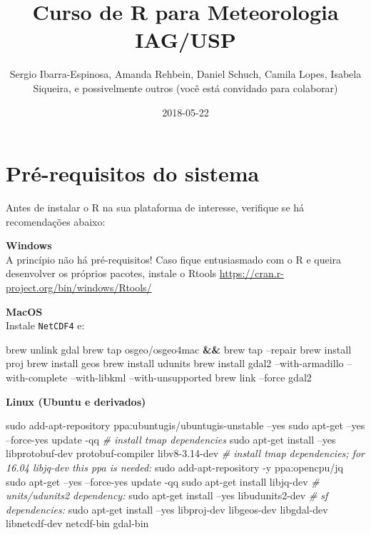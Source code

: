 \documentclass[]{book}
\title{Curso de R para Meteorologia IAG/USP}
\author{Sergio Ibarra-Espinosa, Amanda Rehbein, Daniel Schuch, Camila Lopes,
Isabela Siqueira, e possivelmente outros (você está convidado para
colaborar)}
\date{2018-05-22}
\newenvironment{Shaded}{\begin{snugshade}}{\end{snugshade}}
\newcommand{\KeywordTok}[1]{\textcolor[rgb]{0.13,0.29,0.53}{\textbf{#1}}}
\newcommand{\CommentTok}[1]{\textcolor[rgb]{0.56,0.35,0.01}{\textit{#1}}}
\newcommand{\FunctionTok}[1]{\textcolor[rgb]{0.00,0.00,0.00}{#1}}
\newcommand{\ExtensionTok}[1]{#1}
\newcommand{\NormalTok}[1]{#1}
\begin{document}
\maketitle

{
\setcounter{tocdepth}{1}
\tableofcontents
}
\chapter{Pré-requisitos do sistema}\label{primero}

Antes de instalar o R na sua plataforma de interesse, verifique se há
recomendações abaixo:

\textbf{Windows}\\
A princípio não há pré-requisitos! Caso fique entusiasmado com o R e
queira desenvolver os próprios pacotes, instale o Rtools
\url{https://cran.r-project.org/bin/windows/Rtools/}

\textbf{MacOS}\\
Instale \texttt{NetCDF4} e:

\begin{Shaded}
\begin{Highlighting}[]
\ExtensionTok{brew}\NormalTok{ unlink gdal}
\ExtensionTok{brew}\NormalTok{ tap osgeo/osgeo4mac }\KeywordTok{&&} \ExtensionTok{brew}\NormalTok{ tap --repair}
\ExtensionTok{brew}\NormalTok{ install proj}
\ExtensionTok{brew}\NormalTok{ install geos}
\ExtensionTok{brew}\NormalTok{ install udunits}
\ExtensionTok{brew}\NormalTok{ install gdal2 --with-armadillo --with-complete --with-libkml --with-unsupported}
\ExtensionTok{brew}\NormalTok{ link --force gdal2}
\end{Highlighting}
\end{Shaded}

\textbf{Linux (Ubuntu e derivados)}

\begin{Shaded}
\begin{Highlighting}[]
\FunctionTok{sudo}\NormalTok{ add-apt-repository ppa:ubuntugis/ubuntugis-unstable --yes}
\FunctionTok{sudo}\NormalTok{ apt-get --yes --force-yes update -qq}
\CommentTok{# install tmap dependencies}
\FunctionTok{sudo}\NormalTok{ apt-get install --yes libprotobuf-dev protobuf-compiler libv8-3.14-dev}
\CommentTok{# install tmap dependencies; for 16.04 libjq-dev this ppa is needed:}
\FunctionTok{sudo}\NormalTok{ add-apt-repository -y ppa:opencpu/jq}
\FunctionTok{sudo}\NormalTok{ apt-get --yes --force-yes update -qq}
\FunctionTok{sudo}\NormalTok{ apt-get install libjq-dev}
\CommentTok{# units/udunits2 dependency:}
\FunctionTok{sudo}\NormalTok{ apt-get install --yes libudunits2-dev}
\CommentTok{# sf dependencies:}
\FunctionTok{sudo}\NormalTok{ apt-get install --yes libproj-dev libgeos-dev libgdal-dev libnetcdf-dev  netcdf-bin gdal-bin}
\end{Highlighting}
\end{Shaded}
\end{document}
